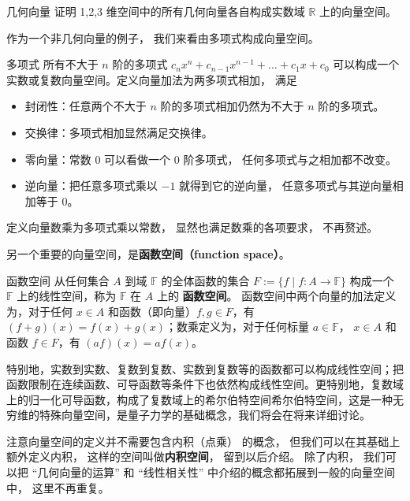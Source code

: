 \begin{exercise}{几何向量}
证明 1,2,3 维空间中的所有几何向量各自构成实数域 $\mathbb R$ 上的向量空间。
\end{exercise}

作为一个非几何向量的例子， 我们来看由多项式构成向量空间。

\begin{example}{多项式}\label{ex_LSpace_1}
所有不大于 $n$ 阶的多项式 $c_n x^n + c_{n-1} x^{n-1} + \dots + c_1 x + c_0$ 可以构成一个实数或复数向量空间。定义向量加法为两多项式相加， 满足
\begin{itemize}
\item 封闭性：任意两个不大于 $n$ 阶的多项式相加仍然为不大于 $n$ 阶的多项式。
\item 交换律：多项式相加显然满足交换律。
\item 零向量：常数 0 可以看做一个 0 阶多项式， 任何多项式与之相加都不改变。
\item 逆向量：把任意多项式乘以 $-1$ 就得到它的逆向量， 任意多项式与其逆向量相加等于 0。
\end{itemize}
定义向量数乘为多项式乘以常数， 显然也满足数乘的各项要求， 不再赘述。
\end{example}

另一个重要的向量空间，是\textbf{函数空间（function space）}。

\begin{example}{函数空间}\label{ex_LSpace_2}
从任何集合 $A$ 到域 $\mathbb{F}$ 的全体函数的集合 $F := \{f \mid f: A \to \mathbb{F} \}$ 构成一个 $\mathbb{F}$ 上的线性空间，称为 $\mathbb{F}$ 在 $A$ 上的 \textbf{函数空间}。 函数空间中两个向量的加法定义为，对于任何 $x \in A$ 和函数（即向量）$f, g\in F$，有 $(f+g)(x)=f(x)+g(x)$；数乘定义为，对于任何标量 $a \in \mathbb{F}$， $x \in A$ 和函数 $f \in F$，有 $(af)(x)=af(x)$。

特别地，实数到实数、复数到复数、实数到复数等的函数都可以构成线性空间；把函数限制在连续函数、可导函数等条件下也依然构成线性空间。更特别地，复数域上的归一化可导函数，构成了复数域上的希尔伯特空间希尔伯特空间，这是一种无穷维的特殊向量空间，是量子力学的基础概念，我们将会在将来详细讨论。
\end{example}

注意向量空间的定义并不需要包含内积（点乘） 的概念， 但我们可以在其基础上额外定义内积， 这样的空间叫做\textbf{内积空间}， 留到以后介绍。 除了内积， 我们可以把 “几何向量的运算” 和 “线性相关性” 中介绍的概念都拓展到一般的向量空间中， 这里不再重复。

